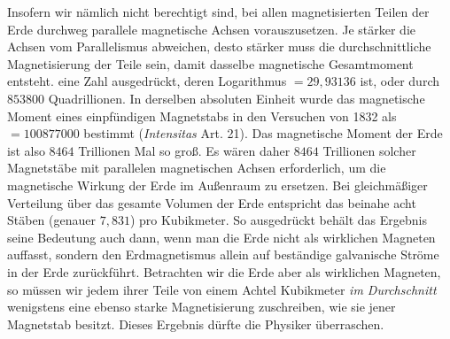 \expandafter\def\csname HistoricalNoteText21\endcsname{Insofern wir nämlich nicht berechtigt sind, bei allen magnetisierten Teilen der Erde durchweg parallele magnetische Achsen vorauszusetzen. Je stärker die Achsen vom Parallelismus abweichen, desto stärker muss die durchschnittliche Magnetisierung der Teile sein, damit dasselbe magnetische Gesamtmoment entsteht.}
eine Zahl ausgedrückt, deren Logarithmus $=29{,}93136$ ist, oder durch $853800$ Quadrillionen. In derselben absoluten Einheit wurde das magnetische Moment eines einpfündigen Magnetstabs in den Versuchen von 1832 als $=100877000$ bestimmt (\textit{Intensitas} Art. 21). Das magnetische Moment der Erde ist also $8464$ Trillionen Mal so groß. Es wären daher $8464$ Trillionen solcher Magnetstäbe mit parallelen magnetischen Achsen erforderlich, um die magnetische Wirkung der Erde im Außenraum zu ersetzen. Bei gleichmäßiger Verteilung über das gesamte Volumen der Erde entspricht das beinahe acht Stäben (genauer $7{,}831$) pro Kubikmeter. So ausgedrückt behält das Ergebnis seine Bedeutung auch dann, wenn man die Erde nicht als wirklichen Magneten auffasst, sondern den Erdmagnetismus allein auf beständige galvanische Ströme in der Erde zurückführt. Betrachten wir die Erde aber als wirklichen Magneten, so müssen wir jedem ihrer Teile von einem Achtel Kubikmeter \textit{im Durchschnitt} wenigstens eine ebenso starke Magnetisierung zuschreiben, wie sie jener Magnetstab besitzt. Dieses Ergebnis dürfte die Physiker überraschen.

